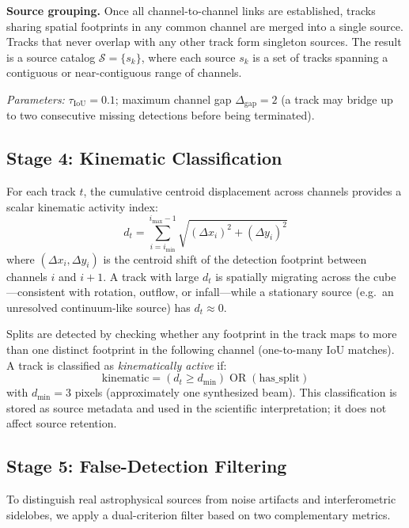 \documentclass{aa}
\begin{document}
\textbf{Source grouping.} Once all channel-to-channel links are established, tracks sharing spatial footprints in any common channel are merged into a single source. Tracks that never overlap with any other track form singleton sources. The result is a source catalog $\mathcal{S} = \{s_k\}$, where each source $s_k$ is a set of tracks spanning a contiguous or near-contiguous range of channels.

\textit{Parameters:} $\tau_{\mathrm{IoU}} = 0.1$; maximum channel gap $\Delta_{\mathrm{gap}} = 2$ (a track may bridge up to two consecutive missing detections before being terminated).

\subsection{Stage 4: Kinematic Classification}
\label{sec:method_kinematic}

For each track $t$, the cumulative centroid displacement across channels provides a scalar kinematic activity index:
\begin{equation}
  d_t = \sum_{i=i_{\min}}^{i_{\max}-1} \sqrt{(\Delta x_i)^2 + (\Delta y_i)^2}
\end{equation}
where $(\Delta x_i, \Delta y_i)$ is the centroid shift of the detection footprint between channels $i$ and $i+1$. A track with large $d_t$ is spatially migrating across the cube---consistent with rotation, outflow, or infall---while a stationary source (e.g.\ an unresolved continuum-like source) has $d_t \approx 0$.

Splits are detected by checking whether any footprint in the track maps to more than one distinct footprint in the following channel (one-to-many IoU matches). A track is classified as \textit{kinematically active} if:
\begin{equation}
  \mathrm{kinematic} = (d_t \geq d_{\min}) \;\mathrm{OR}\; (\mathrm{has\_split})
\end{equation}
with $d_{\min} = 3$ pixels (approximately one synthesized beam). This classification is stored as source metadata and used in the scientific interpretation; it does not affect source retention.

\subsection{Stage 5: False-Detection Filtering}
\label{sec:method_false_det}

To distinguish real astrophysical sources from noise artifacts and interferometric sidelobes, we apply a dual-criterion filter based on two complementary metrics.
\end{document}
